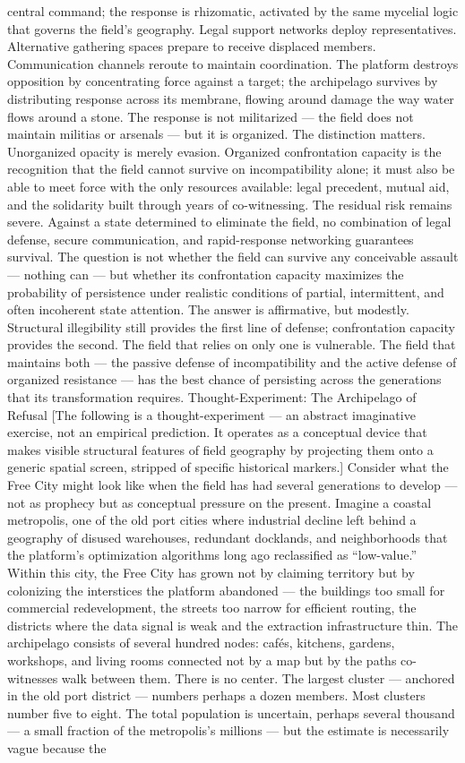 central command; the response is rhizomatic, activated by the same mycelial logic that governs the field’s geography. Legal support networks deploy representatives. Alternative gathering spaces prepare to receive displaced members. Communication channels reroute to maintain coordination. The platform destroys opposition by concentrating force against a target; the archipelago survives by distributing response across its membrane, flowing around damage the way water flows around a stone. The response is not militarized — the field does not maintain militias or arsenals — but it is organized. The distinction matters. Unorganized opacity is merely evasion. Organized confrontation capacity is the recognition that the field cannot survive on incompatibility alone; it must also be able to meet force with the only resources available: legal precedent, mutual aid, and the solidarity built through years of co-witnessing. The residual risk remains severe. Against a state determined to eliminate the field, no combination of legal defense, secure communication, and rapid-response networking guarantees survival. The question is not whether the field can survive any conceivable assault — nothing can — but whether its confrontation capacity maximizes the probability of persistence under realistic conditions of partial, intermittent, and often incoherent state attention. The answer is affirmative, but modestly. Structural illegibility still provides the first line of defense; confrontation capacity provides the second. The field that relies on only one is vulnerable. The field that maintains both — the passive defense of incompatibility and the active defense of organized resistance — has the best chance of persisting across the generations that its transformation requires. Thought-Experiment: The Archipelago of Refusal [The following is a thought-experiment — an abstract imaginative exercise, not an empirical prediction. It operates as a conceptual device that makes visible structural features of field geography by projecting them onto a generic spatial screen, stripped of specific historical markers.] Consider what the Free City might look like when the field has had several generations to develop — not as prophecy but as conceptual pressure on the present. Imagine a coastal metropolis, one of the old port cities where industrial decline left behind a geography of disused warehouses, redundant docklands, and neighborhoods that the platform’s optimization algorithms long ago reclassified as “low-value.” Within this city, the Free City has grown not by claiming territory but by colonizing the interstices the platform abandoned — the buildings too small for commercial redevelopment, the streets too narrow for efficient routing, the districts where the data signal is weak and the extraction infrastructure thin. The archipelago consists of several hundred nodes: cafés, kitchens, gardens, workshops, and living rooms connected not by a map but by the paths co-witnesses walk between them. There is no center. The largest cluster — anchored in the old port district — numbers perhaps a dozen members. Most clusters number five to eight. The total population is uncertain, perhaps several thousand — a small fraction of the metropolis’s millions — but the estimate is necessarily vague because the 